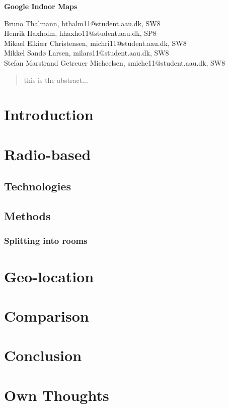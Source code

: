 \documentclass[12pt,a4paper]{article}
\begin{document}
\begin{center}
\bigskip\bigskip
{\Large\bf Google Indoor Maps}
\bigskip\bigskip


Bruno Thalmann, bthalm11@student.aau.dk, SW8\\
Henrik Haxholm, hhaxho11@student.aau.dk, SP8\\
Mikael Elkiær Christensen, michri11@student.aau.dk, SW8\\
Mikkel Sandø Larsen, milars11@student.aau.dk, SW8\\
Stefan Marstrand Getreuer Micheelsen, smiche11@student.aau.dk, SW8

\bigskip
\begin{abstract}
this is the abstract...
\end{abstract}

\thispagestyle{empty}
\end{center}


\titlepage



\thispagestyle{plain}


\section{Introduction}


\section{Radio-based}

\subsection{Technologies}




\subsection{Methods}

\subsubsection{Splitting into rooms}





\section{Geo-location}

\section{Comparison}

\section{Conclusion}

\section{Own Thoughts}




\end{document}
